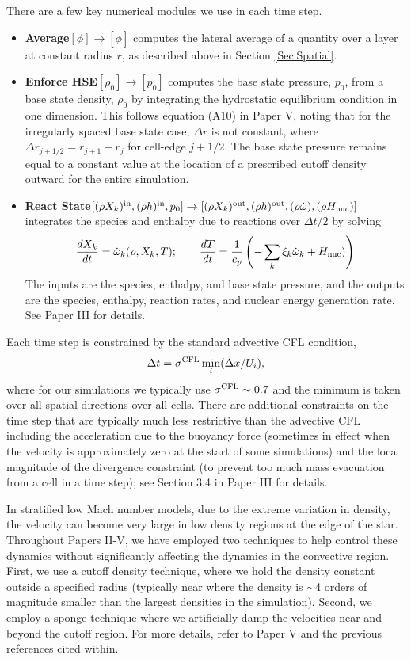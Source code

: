 There are a few key numerical modules we use in each time step.
\begin{itemize}
\item {\bf Average}$[\phi]\rightarrow[\overline\phi]$ computes the lateral average of a quantity over a layer at constant radius $r$, as described above in Section \ref{Sec:Spatial}.
\item {\bf Enforce HSE}$[\rho_0]\rightarrow[p_0]$ computes the base state pressure, $p_0$, from a base state density, $\rho_0$ by integrating the hydrostatic equilibrium condition in one dimension. 
This follows equation (A10) in Paper V, noting that for the irregularly spaced base state case, $\Delta r$ is not constant, where $\Delta r_{j+1/2} = r_{j+1} - r_j$ for cell-edge $j+1/2$.  
The base state pressure remains equal to a constant value at the location of a prescribed cutoff density outward for the entire simulation.
\item {\bf React State}$[(\rho X_k)^{\rm in},(\rho h)^{\rm in},p_0]\rightarrow[(\rho X_k)^{\rm out},(\rho h)^{\rm out},(\rho\dot\omega),(\rho H_{\rm nuc})]$ integrates the species and enthalpy due to reactions over $\Delta t/2$ by solving
\begin{equation}
\frac{dX_k}{dt} = \dot\omega_k(\rho,X_k,T); \qquad
\frac{dT}{dt} = \frac{1}{c_p}\left(-\sum_k\xi_k\dot\omega_k + H_{\rm nuc})\right)
\end{equation}
The inputs are the species, enthalpy, and base state pressure, and the outputs are the species, enthalpy, reaction rates, and nuclear energy generation rate.
See Paper III for details.
\end{itemize}
Each time step is constrained by the standard advective CFL condition,
\begin{equation}
\Delta t = \sigma^{\rm CFL} \min_i(\Delta x / U_i),
\end{equation}
where for our simulations we typically use $\sigma^{\rm CFL}\sim 0.7$ and the minimum is taken over all spatial directions over all cells.
There are additional constraints on the time step that are typically much less restrictive than the advective CFL including
the acceleration due to the buoyancy force (sometimes in effect when the velocity is approximately zero at the start of some simulations) 
and the local magnitude of the divergence constraint (to prevent too much mass evacuation from a cell in a time step); see Section 3.4 in Paper III for details.

In stratified low Mach number models, due to the extreme variation in density, the velocity can become very large in low density regions at the edge of the star.
Throughout Papers II-V, we have employed two techniques to help control these dynamics without significantly affecting the dynamics in the convective region.
First, we use a cutoff density technique, where we hold the density constant outside a specified radius (typically near where the density is $\sim$4 orders of magnitude smaller than the largest densities in the simulation).
Second, we employ a sponge technique where we artificially damp the velocities near and beyond the cutoff region.
For more details, refer to Paper V and the previous references cited within.

